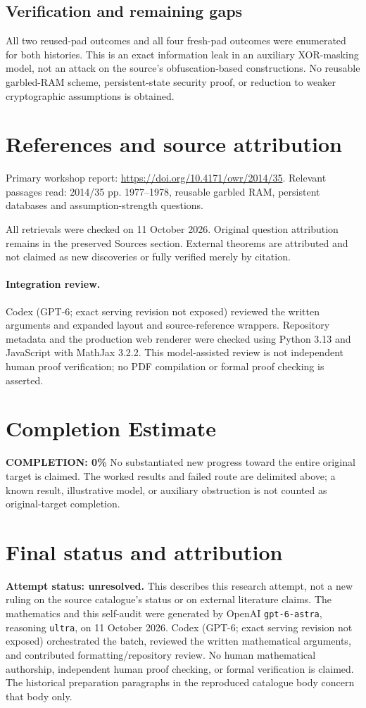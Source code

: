 \documentclass[11pt]{article}
\begin{document}
\subsection{Verification and remaining gaps}
All two reused-pad outcomes and all four fresh-pad outcomes were enumerated for both histories. This is an exact information leak in an auxiliary XOR-masking model, not an attack on the source's obfuscation-based constructions. No reusable garbled-RAM scheme, persistent-state security proof, or reduction to weaker cryptographic assumptions is obtained.

\section{References and source attribution}
Primary workshop report: \url{https://doi.org/10.4171/owr/2014/35}. Relevant passages read: 2014/35 pp. 1977--1978, reusable garbled RAM, persistent databases and assumption-strength questions.

All retrievals were checked on 11 October 2026. Original question attribution remains in the preserved Sources section. External theorems are attributed and not claimed as new discoveries or fully verified merely by citation.


\paragraph{Integration review.} Codex (GPT-6; exact serving revision not exposed) reviewed the written arguments and expanded layout and source-reference wrappers. Repository metadata and the production web renderer were checked using Python 3.13 and JavaScript with MathJax 3.2.2. This model-assisted review is not independent human proof verification; no PDF compilation or formal proof checking is asserted.

\section{Completion Estimate}
\noindent\textbf{COMPLETION: 0\%}
No substantiated new progress toward the entire original target is claimed. The worked results and failed route are delimited above; a known result, illustrative model, or auxiliary obstruction is not counted as original-target completion.

\section{Final status and attribution}
\textbf{Attempt status: unresolved.} This describes this research attempt, not a new ruling on the source catalogue's status or on external literature claims.
The mathematics and this self-audit were generated by OpenAI \texttt{gpt-6-astra}, reasoning \texttt{ultra}, on 11 October 2026. Codex (GPT-6; exact serving revision not exposed) orchestrated the batch, reviewed the written mathematical arguments, and contributed formatting/repository review. No human mathematical authorship, independent human proof checking, or formal verification is claimed. The historical preparation paragraphs in the reproduced catalogue body concern that body only.
\end{document}
